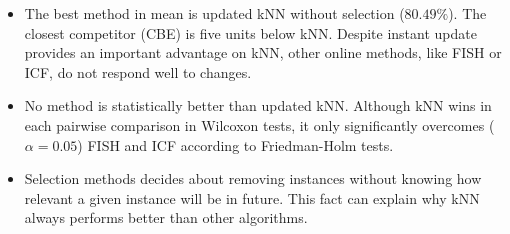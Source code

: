 \documentclass[preprint,12pt]{elsarticle}
\begin{document}
\begin{itemize}
	\item The best method in mean is updated kNN without selection ($80.49\%$). The closest competitor (CBE) is five units below kNN. Despite instant update provides an important advantage on kNN, other online methods, like FISH or ICF, do not respond well to changes.
	\item No method is statistically better than updated kNN. Although kNN wins in each pairwise comparison in Wilcoxon tests, it only significantly overcomes ($\alpha = 0.05$) FISH and ICF according to Friedman-Holm tests.
	\item Selection methods decides about removing instances without knowing how relevant a given instance will be in future. This fact can explain why kNN always performs better than other algorithms. %
\end{itemize}
\end{document}
